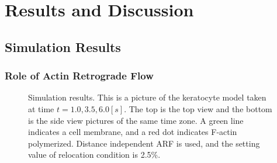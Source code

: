 \documentclass[a4paper,12pt, oneside]{book}
\begin{document}
\chapter{Results and Discussion}
\section{Simulation Results}
\subsection{Role of Actin Retrograde Flow}
\begin{figure}[tbp]
 \caption{Simulation results. This is a picture of the keratocyte model taken at time $t = 1.0, 3.5, 6.0 [s]$. The top is the top view and the bottom is the side view pictures of the same time zone. A green line indicates a cell membrane, and a red dot indicates F-actin polymerized. Distance independent ARF is used, and the setting value of relocation condition is 2.5\%.}
 \label{fig:res0}
\end{figure}
\end{document}
